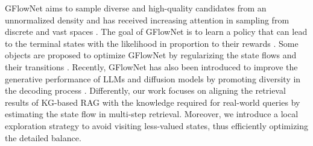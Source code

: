 GFlowNet \cite{bengio2023gflownet} aims to sample diverse and high-quality candidates from an unnormalized density and has received increasing attention in sampling from discrete and vast spaces \cite{ghari2023generative,lu2024cell,deleu2023joint,deleu2022bayesian,m2024gflownet}.
The goal of GFlowNet is to learn a policy that can lead to the terminal states with the likelihood in proportion to their rewards \cite{zhang2022generative}.
Some objects are proposed to optimize GFlowNet by regularizing the state flows and their transitions \cite{tongimproving,malkin2022trajectory,madan2023learning}.
Recently, GFlowNet has also been introduced to improve the generative performance of LLMs and diffusion models by promoting diversity in the decoding process \cite{venkatramanamortizing,huamortizing,yu2024flow,kang2025gflowvlm,lingamenhancing} .
Differently, our work focuses on aligning the retrieval results of KG-based RAG with the knowledge required for real-world queries by estimating the state flow in multi-step retrieval.
Moreover, we introduce a local exploration strategy to avoid visiting less-valued states, thus efficiently optimizing the detailed balance.